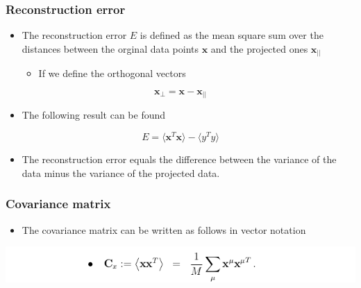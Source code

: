 \documentclass[11pt]{article}
\begin{document}
\subsubsection{Reconstruction error}
\label{sec:org9437eff}
\begin{itemize}
\item The reconstruction error \(E\) is defined as the mean square sum over the distances between the orginal data points \(\pmb x\) and the projected ones \(\pmb x_{||}\)
\begin{itemize}
\item If we define the orthogonal vectors
\end{itemize}
\end{itemize}
\begin{equation}
  \pmb x_\bot = \pmb x - \pmb x_{||}
\end{equation}
\begin{itemize}
\item The following result can be found
\end{itemize}
\begin{equation}
  E = \langle \pmb x^T \pmb x \rangle - \langle y^T y \rangle 
\end{equation}
\begin{itemize}
\item The reconstruction error equals the difference between the variance of the data minus the variance of the projected data.
\end{itemize}

\subsubsection{Covariance matrix}
\label{sec:org0bd105d}
\begin{itemize}
\item The covariance matrix can be written as follows in vector notation
\end{itemize}
\begin{center}
\includegraphics[width=.9\linewidth]{Principal Component Analysis/screenshot_2018-11-20_21-40-24.png}
\end{center}
\end{document}
